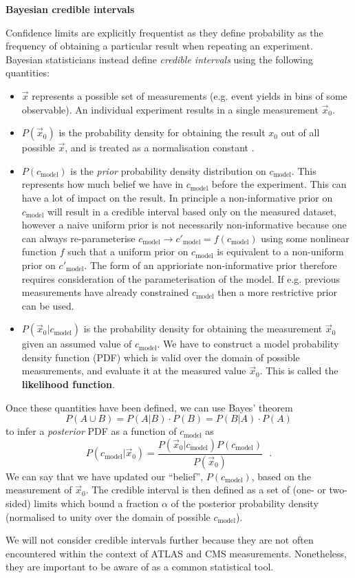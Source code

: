\vspace{0.5cm}
\noindent \textbf{Bayesian credible intervals}
\vspace{0.5cm}

Confidence limits are explicitly frequentist as they define probability as the frequency of obtaining a particular result when repeating an experiment. Bayesian statisticians instead define \textit{credible intervals} using the following quantities:
\begin{itemize}
\item $\vec{x}$ represents a possible set of measurements (e.g. event yields in bins of some observable). An individual experiment results in a single measurement $\vec{x}_0$.
\item $P\left( \vec{x}_0 \right)$ is the probability density for obtaining the result $x_0$ out of all possible $\vec{x}$, and is treated as a normalisation constant \cite{Feldman-Cousins-1}.
\item $P\left( c_\text{model} \right)$ is the \textit{prior} probability density distribution on $c_\text{model}$. This represents how much belief we have in $c_\text{model}$ before the experiment. This can have a lot of impact on the result. In principle a non-informative prior on $c_\text{model}$ will result in a credible interval based only on the measured dataset, however a naive uniform prior is not necessarily non-informative because one can always re-parameterise $c_\text{model}\rightarrow c'_\text{model}=f\left(c_\text{model}\right)$ using some nonlinear function $f$ such that a uniform prior on $c_\text{model}$ is equivalent to a non-uniform prior on $c'_\text{model}$. The form of an apprioriate non-informative prior therefore requires consideration of the parameterisation of the model. If e.g. previous measurements have already constrained $c_\text{model}$ then a more restrictive prior can be used.
\item $P\left(\vec{x}_0|c_\text{model}\right)$ is the probability density for obtaining the measurement $\vec{x}_0$ given an assumed value of $c_\text{model}$. We have to construct a model probability density function (PDF) which is valid over the domain of possible measurements, and evaluate it at the measured value $\vec{x}_0$. This is called the \textbf{likelihood function}.
\end{itemize}
Once these quantities have been defined, we can use Bayes' theorem
\begin{equation}
P(A \cup B) = P(A|B) \cdot P(B) = P(B|A) \cdot P(A)
\end{equation}
to infer a \textit{posterior} PDF as a function of $c_\text{model}$ as  
\begin{equation}
P\left(c_\text{model}|\vec{x}_0\right) = \frac{ P\left(\vec{x}_0|c_\text{model}\right) P\left(c_\text{model}\right) }{ P\left(\vec{x}_0\right) } ~~~.
\end{equation}
We can say that we have updated our ``belief'', $P\left(c_\text{model}\right)$, based on the measurement of $\vec{x}_0$. The credible interval is then defined as a set of (one- or two-sided) limits which bound a fraction $\alpha$ of the posterior probability density (normalised to unity over the domain of possible $c_\text{model}$).

We will not consider credible intervals further because they are not often encountered within the context of ATLAS and CMS measurements. Nonetheless, they are important to be aware of as a common statistical tool.
